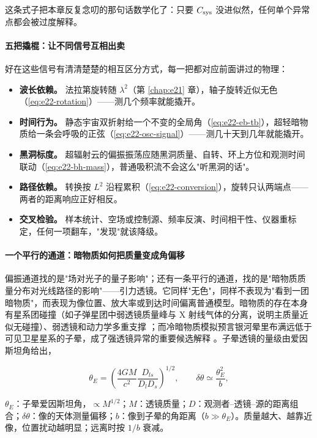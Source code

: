 这条式子把本章反复念叨的那句话数学化了：只要 \(C_{\rm sys}\) 没进似然，任何单个异常点都会被过度解释。

\paragraph{五把撬棍：让不同信号互相出卖}

好在这些信号有清清楚楚的相互区分方式，每一把都对应前面讲过的物理：

\begin{itemize}
\item \textbf{波长依赖。} 法拉第旋转随 \(\lambda^2\)（第 \ref{chap:e21} 章），轴子旋转近似无色（\eqref{eq:e22-rotation}）——测几个频率就能撬开。
\item \textbf{时间行为。} 静态宇宙双折射给一个不变的全局角（\eqref{eq:e22-eb-tb}），超轻暗物质给一条会呼吸的正弦（\eqref{eq:e22-osc-signal}）——测几十天到几年就能撬开。
\item \textbf{黑洞标度。} 超辐射云的偏振振荡应随黑洞质量、自转、环上方位和观测时间联动（\eqref{eq:e22-bh-mass}），普通吸积流不会这么"听黑洞的话"。
\item \textbf{路径依赖。} 转换按 \(L^2\) 沿程累积（\eqref{eq:e22-conversion}），旋转只认两端点——两者的距离响应正好相反。
\item \textbf{交叉检验。} 样本统计、空场或控制源、频率反演、时间相干性、仪器重标定，任何一项翻车，"发现"就该降级。
\end{itemize}

\paragraph{一个平行的通道：暗物质如何把质量变成角偏移}

偏振通道找的是"场对光子的量子影响"；还有一条平行的通道，找的是"暗物质质量分布对光线路径的影响"——引力透镜。它同样"无色"，同样不表现为"看到一团暗物质"，而表现为像位置、放大率或到达时间偏离普通模型。暗物质的存在本身有星系团碰撞（如子弹星团中弱透镜质量峰与 X 射线气体的分离，说明主质量近似无碰撞）、弱透镜和动力学多重支撑 \citep{2006ApJ...648L.109C,1993ApJ...404..441K}；而冷暗物质模拟预言银河晕里布满远低于可见卫星星系的子晕，成了强透镜异常的重要候选解释 \citep{1994ApJ...427L...1F,1999ApJ...524L..19M,2008Natur.454..735D}。子晕透镜的量级由爱因斯坦角给出，

\begin{equation}
  \theta_E=\left(\frac{4GM}{c^2}\frac{D_{ls}}{D_lD_s}\right)^{1/2},
  \qquad
  \delta\theta\simeq\frac{\theta_E^2}{b},
  \label{eq:e22-lensing}
\end{equation}
\begin{formulaexplain}
\(\theta_E\)：子晕爱因斯坦角，\(\propto M^{1/2}\)；\(M\)：透镜质量；\(D\)：观测者--透镜--源的距离组合；\(\delta\theta\)：像的天体测量偏移；\(b\)：像到子晕的角距离（\(b\gg\theta_E\)）。质量越大、越靠近像，位置扰动越明显；远离时按 \(1/b\) 衰减。
\end{formulaexplain}

